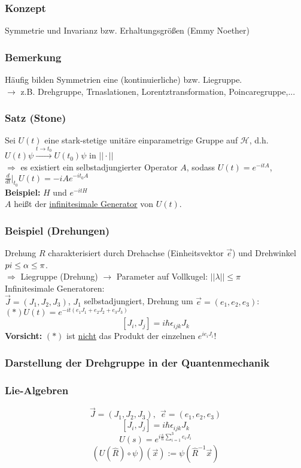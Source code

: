 \documentclass[twoside,a4paper]{scrartcl}
\renewcommand{\1}{\mathds{1}}
\newcommand{\Ra}{\Rightarrow}
\newcommand{\ra}{\rightarrow}
\renewcommand{\l}{\lambda}
\renewcommand{\H}{\mathcal{H}}
\begin{document}
\subsubsection*{Konzept}
Symmetrie und Invarianz bzw. Erhaltungsgrößen (Emmy Noether)
\subsubsection*{Bemerkung}
Häufig bilden Symmetrien eine (kontinuierliche) bzw. Liegruppe.\\
$\ra$ z.B. Drehgruppe, Trnaslationen, Lorentztransformation, Poincaregruppe,...
\subsubsection*{Satz (Stone)}
Sei $U(t)$ eine stark-stetige unitäre einparametrige Gruppe auf $\H$, d.h. $U(t)\psi \stackrel{t \ra t_0}{\ra} U(t_0)\psi$ in $||\cdot||$\\
$\Ra$ es existiert ein selbstadjungierter Operator $A$, sodass $U(t)=e^{-itA}$, $\frac{d}{dt}|_{t_0}U(t)=-iAe^{-it_0A}$\\
\textbf{Beispiel:} $H$ und $e^{-itH}$\\
$A$ heißt der \underline{infinitesimale Generator} von $U(t)$.
\subsubsection*{Beispiel (Drehungen)}
Drehung $R$ charakterisiert durch Drehachse (Einheitsvektor $\vec e$) und Drehwinkel $\-pi \leq \alpha \leq \pi$.\\
$\Ra$ Liegruppe (Drehung) $\ra$ Parameter auf Vollkugel: $||\l||\leq \pi$\\
Infinitesimale Generatoren:\\
$\vec J=(J_1,J_2,J_3)$, $J_1$ selbstadjungiert, Drehung um $\vec e=(e_1,e_2,e_3)$: $(*) U(t)=e^{-it(e_1J_1+e_2J_2+e_3J_3)}$
$$[J_i,J_j]=i\hbar \epsilon_{ijk} J_k$$
\textbf{Vorsicht:} $(*)$ ist \underline{nicht} das Produkt der einzelnen $e^{ie_iJ_i}$!

\subsubsection*{Darstellung der Drehgruppe in der Quantenmechanik}
\subsubsection*{Lie-Algebren}
$$\vec J=(J_1,J_2,J_3), \ \ \vec e=(e_1,e_2,e_3)$$
$$[J_i,J_j]=i\hbar \epsilon_{ijk} J_k$$
$$U(s)=e^{i\frac{s}{\hbar}\sum_{i=1}^3 e_iJ_i}$$
$$(U(\hat R)\circ \psi)(\vec x):= \psi(\hat R^{-1}\vec x)$$
\end{document}
